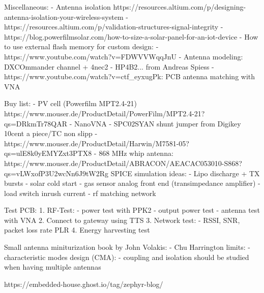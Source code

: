 Miscellaneous:
    - Antenna isolation https://resources.altium.com/p/designing-antenna-isolation-your-wireless-system
    - https://resources.altium.com/p/validation-structures-signal-integrity
    - https://blog.powerfilmsolar.com/how-to-size-a-solar-panel-for-an-iot-device
    - How to use external flash memory for custom design: 
        - https://www.youtube.com/watch?v=FDWVVWqqJnU
    - Antenna modeling: DXCOmmander channel + 4nec2
    - HP4B2... from Andreas Spiess
    - https://www.youtube.com/watch?v=ctf_eyxugPk: PCB antenna matching with VNA
    
Buy list:
    - PV cell (Powerfilm MPT2.4-21)
    https://www.mouser.de/ProductDetail/PowerFilm/MPT2.4-21?qs=DRkmTr78QAR%
    - NanoVNA
    - SPC02SYAN shunt jumper from Digikey 10cent a piece/TC non slipp
    - https://www.mouser.de/ProductDetail/Harwin/M7581-05?qs=ulE8k0yEMYZxt3PTX8%
    - 868 MHz whip antenna:
        https://www.mouser.de/ProductDetail/ABRACON/AEACAC053010-S868?qs=vLWxofP3U2wcNn6J9tW2Rg%
SPICE simulation ideas:
    - Lipo discharge + TX bursts
    - solar cold start
    - gas sensor analog front end (transimpedance amplifier)
    - load switch inrush current
    - rf matching network

Test PCB:
    1. RF-Test:
        - power test with PPK2 
        - output power test 
        - antenna test with VNA 
    2. Connect to gateway using TTS 
    3. Network test:
        - RSSI, SNR, packet loss rate PLR 
    4. Energy harvesting test

Small antenna miniturization book by John Volakis:
    - Chu Harrington limits: 
    - characteristic modes design (CMA): 
    - coupling and isolation should be studied when having multiple antennas

https://embedded-house.ghost.io/tag/zephyr-blog/

